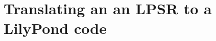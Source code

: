 \documentclass[12pt,a4paper]{article}
\begin{document}
\section{Translating an an LPSR to a LilyPond code}




\pagebreak

\lstlistoflistings

\listoffigures

\tableofcontents


\end{document}

